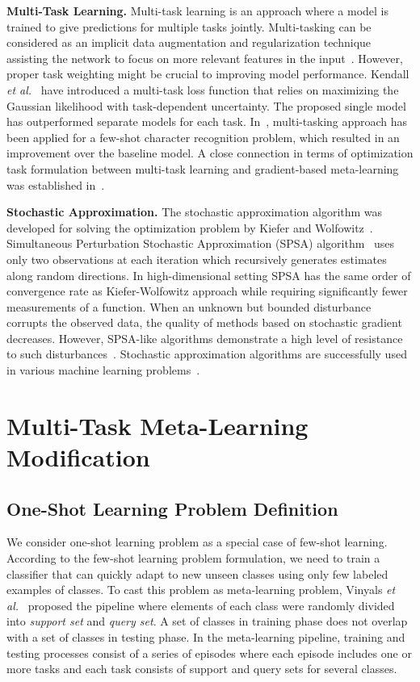 \documentclass{article}
\begin{document}
{\bf Multi-Task Learning.} Multi-task learning is an approach where a model is trained to give predictions for multiple tasks jointly. Multi-tasking can be considered as an implicit data augmentation and regularization technique assisting the network to focus on more relevant features in the input~\cite{ruder2017overview}. However, proper task weighting might be crucial to improving model performance. Kendall {\it et al.}~\cite{kendall2018multi} have introduced a multi-task loss function that relies on maximizing the Gaussian likelihood with task-dependent uncertainty. The proposed single model has outperformed separate models for each task. In~\cite{boiarov2020simultaneous}, multi-tasking approach has been applied for a few-shot character recognition problem, which resulted in an improvement over the baseline model. A close connection in terms of optimization task formulation between multi-task learning and gradient-based meta-learning was established in~\cite{wang2021bridging}. 



{\bf Stochastic Approximation. }The stochastic approximation algorithm was developed for solving the optimization problem by Kiefer and Wolfowitz~\cite{kiefer1952stochastic}. Simultaneous Perturbation Stochastic Approximation (SPSA) algorithm~\cite{spall1992multivariate} uses only two observations at each iteration which recursively generates estimates along random directions. In high-dimensional setting SPSA has the same order of convergence rate as Kiefer-Wolfowitz approach while requiring significantly fewer measurements of a function. When an unknown but bounded disturbance corrupts the observed data, the quality of methods based on stochastic gradient decreases. However, SPSA-like algorithms demonstrate a high level of resistance to such disturbances~\cite{granichin2015randomized}. Stochastic approximation algorithms are successfully used in various machine learning problems~\cite{granichin2015randomized}.

\section{Multi-Task Meta-Learning Modification}

\subsection{One-Shot Learning Problem Definition}

We consider one-shot learning problem as a special case of few-shot learning. According to the few-shot learning problem formulation, we need to train a classifier that can quickly adapt to new unseen classes using only few labeled examples of classes. To cast this problem as meta-learning problem, Vinyals  {\it et al.}~\cite{vinyals2016matching} proposed the pipeline where elements of each class were randomly divided into {\it support set} and {\it query set}. A set of classes in training phase does not overlap with a set of classes in testing phase. In the meta-learning pipeline, training and testing processes consist of a series of episodes where each episode  includes one or more tasks and each task  consists of support and query sets for several classes.
\end{document}
